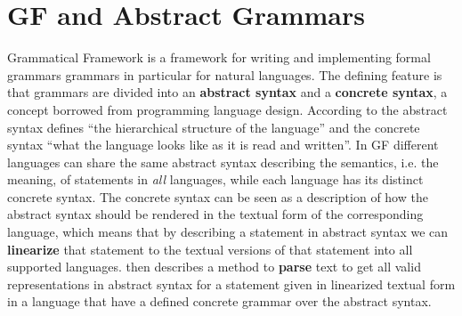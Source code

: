 \section{GF and Abstract Grammars}
Grammatical Framework \citep{ranta2004grammatical} is a framework for writing and implementing formal grammars grammars in particular for natural languages. The defining feature is that grammars are divided into an \textbf{abstract syntax} and a \textbf{concrete syntax}, a concept borrowed from programming language design. According to \citeauthor{ranta2004grammatical} the abstract syntax defines ``the hierarchical structure of the language'' and the concrete syntax ``what the language looks like as it is read and written''. In GF different languages can share the same abstract syntax describing the semantics, i.e. the meaning, of statements in \emph{all} languages, while each language has its distinct concrete syntax. The concrete syntax can be seen as a description of how the abstract syntax should be rendered in the textual form of the corresponding language, which means that by describing a statement in abstract syntax we can \textbf{linearize} that statement to the textual versions of that statement into all supported languages. \citet{angelov2009incremental} then describes a method to \textbf{parse} text to get all valid representations in abstract syntax for a statement given in linearized textual form in a language that have a defined concrete grammar over the abstract syntax.

